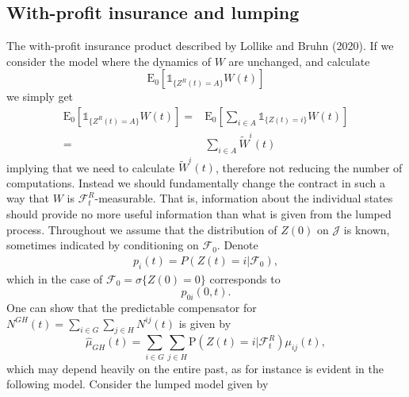 \documentclass[12pt]{article}
\newcommand{\E}{\text{E}}
\newcommand{\indic}[1]{\mathds{1}_{ \{ #1 \} }}
\renewcommand{\P}{\text{P}}
\theoremstyle{my_thm}
\theoremstyle{my_def}
\theoremstyle{my_thm2}
\begin{document}
\newpage
\appendix

\subsection*{With-profit insurance and lumping}
The with-profit insurance product described by Lollike and Bruhn (2020). If we consider the model where the dynamics of $W$ are unchanged, and calculate
$$
\E_0 [\indic{Z^R(t) = A} W(t)]
$$
we simply get
\begin{align*}
\E_0 [\indic{Z^R(t) = A} W(t)] = & \E_0  \left[ \sum_{i \in A} \indic{Z(t)=i} W(t) \right]
\\
=& \sum_{i \in A} \tilde{W}^i(t)
\end{align*}
implying that we need to calculate $\tilde{W}^i(t)$, therefore not reducing the number of computations. Instead we should fundamentally change the contract in such a way that $W$ is $\mathcal{F}_t^R$-measurable. That is, information about the individual states should provide no more useful information than what is given from the lumped process. Throughout we assume that the distribution of $Z(0)$ on $\mathcal{J}$ is known, sometimes indicated by conditioning on $\mathcal{F}_0$. Denote
\begin{align*}
p_i(t)=P(Z(t)=i|\mathcal{F}_0),
\end{align*}
which in the case of $\mathcal{F}_0=\sigma\{ Z(0) = 0\}$ corresponds to
$$
p_{0i}(0,t).
$$
One can show that the predictable compensator for $N^{GH}(t)=\sum_{i \in G}\sum_{j \in H} N^{ij}(t)$ is given by
$$
\hat{\mu}_{GH}(t)=\sum_{i \in G}\sum_{j \in H} \P(Z(t)=i |\mathcal{F}_t^R) \mu_{ij}(t),
$$
which may depend heavily on the entire past, as for instance is evident in the following model. Consider the lumped model given by
\def\sca{3.5}
\def\scaa{0.9}
\begin{figure}[H]
\begin{center}
\end{center}
\end{figure}
\end{document}
